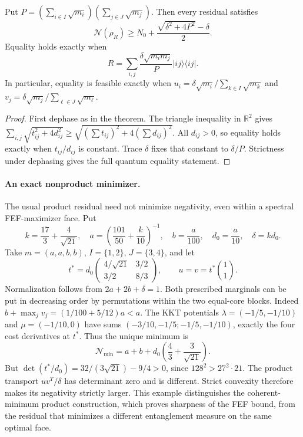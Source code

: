 \begin{corollary}\label{cor:negativity-total}
Put $P=(\sum_{i\in I}\sqrt{m_i})(\sum_{j\in J}\sqrt{m_j})$.
Then every residual satisfies
\[
 \boxed{\quad \mathcal N(\rho_R)\ge
 N_0+\frac{\sqrt{\delta^2+4P^2}-\delta}{2}.\quad}
\]
Equality holds exactly when
\[
 R=\sum_{i,j}\frac{\delta\sqrt{m_i m_j}}{P}
                         |ij\rangle\langle ij|.
\]
In particular, equality is feasible exactly when
$u_i=\delta\sqrt{m_i}/\sum_{k\in I}\sqrt{m_k}$ and
$v_j=\delta\sqrt{m_j}/\sum_{\ell\in J}\sqrt{m_\ell}$.
\end{corollary}
\begin{proof}
First dephase as in the theorem. The triangle inequality in $\mathbb R^2$
gives
$\sum_{i,j}\sqrt{t_{ij}^2+4d_{ij}^2}\ge
\sqrt{(\sum t_{ij})^2+4(\sum d_{ij})^2}$.
All $d_{ij}>0$, so equality holds exactly when $t_{ij}/d_{ij}$ is constant.
Trace $\delta$ fixes that constant to $\delta/P$. Strictness under
dephasing gives the full quantum equality statement.
\end{proof}

\paragraph{An exact nonproduct minimizer.}
The usual product residual need not minimize negativity, even within a
spectral FEF-maximizer face. Put
\[
 k=\frac{17}{3}+\frac4{\sqrt{21}},\quad
 a=\left(\frac{101}{50}+\frac{k}{10}\right)^{-1},\quad
 b=\frac a{100},\quad d_0=\frac a{10},\quad \delta=kd_0.
\]
Take $m=(a,a,b,b)$, $I=\{1,2\}$, $J=\{3,4\}$, and let
\[
 t^*=d_0\begin{pmatrix}4/\sqrt{21}&3/2\\3/2&8/3\end{pmatrix},
 \qquad u=v=t^*\binom11.
\]
Normalization follows from $2a+2b+\delta=1$. Both prescribed marginals
can be put in decreasing order by permutations within the two equal-core
blocks. Indeed $b+\max_jv_j=(1/100+5/12)a<a$.
The KKT potentials $\lambda=(-1/5,-1/10)$ and $\mu=(-1/10,0)$ have
sums $(-3/10,-1/5;-1/5,-1/10)$, exactly the four cost derivatives at
$t^*$. Thus the unique minimum is
\[
 \mathcal N_{\min}=a+b+d_0\left(\frac43+\frac3{\sqrt{21}}\right).
\]
But
$\det(t^*/d_0)=32/(3\sqrt{21})-9/4>0$, since
$128^2>27^2\cdot21$. The product transport $uv^T/\delta$ has determinant
zero and is different. Strict convexity therefore makes its negativity
strictly larger. This example distinguishes the coherent-minimum product
construction, which proves sharpness of the FEF bound, from the residual
that minimizes a different entanglement measure on the same optimal face.

